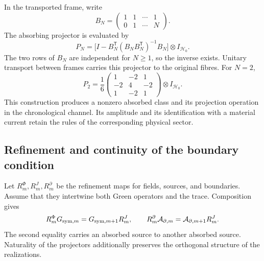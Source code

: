 In the transported frame, write
\[
 B_N=\begin{pmatrix}1&1&\cdots&1\\0&1&\cdots&N\end{pmatrix}.
\]
The absorbing projector is evaluated by
\begin{equation}
 P_N=\bigl[I-B_N^{\mathsf T}(B_NB_N^{\mathsf T})^{-1}B_N\bigr]
       \otimes I_{\mathcal H_0}.
 \label{vii:eq:proyector-momentos-cronologicos}
\end{equation}
The two rows of \(B_N\) are independent for \(N\geq1\), so
the inverse exists. Unitary transport between frames carries this
projector to the original fibres. For \(N=2\),
\[
 P_2=\frac16
 \begin{pmatrix}1&-2&1\\-2&4&-2\\1&-2&1\end{pmatrix}
 \otimes I_{\mathcal H_0}.
\]
This construction produces a nonzero absorbed class and its projection
operation in the chronological channel. Its amplitude and its identification with a
material current retain the rules of the corresponding physical sector.

\subsection{Refinement and continuity of the boundary condition}
\label{vii:subsec:refinamiento-absorcion}

Let \(R_m^\Phi,R_m^J,R_m^\partial\) be the refinement maps for
fields, sources, and boundaries. Assume that they intertwine both Green operators and the
trace. Composition gives
\begin{equation}
 R_m^\Phi G_{{\rm sym},m}=G_{{\rm sym},m+1}R_m^J,\qquad
 R_m^\partial\mathcal A_{\partial,m}
 =\mathcal A_{\partial,m+1}R_m^J.
 \label{vii:eq:refinamiento-lectura-absorcion}
\end{equation}
The second equality carries an absorbed source to another absorbed source.
Naturality of the projectors additionally preserves the orthogonal
structure of the realizations.

